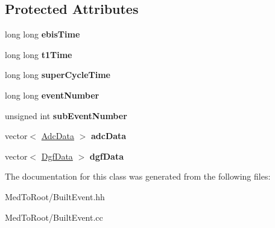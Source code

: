 \subsection*{Protected Attributes}
\begin{DoxyCompactItemize}
\item 
\mbox{\label{class_built_event_a03d3a46cd8ffa584750f814895a36719}} 
long long {\bfseries ebis\+Time}
\item 
\mbox{\label{class_built_event_a7a57667e365324e20b3cd27411bf27a4}} 
long long {\bfseries t1\+Time}
\item 
\mbox{\label{class_built_event_af4382a0a57b77db32d3934fa2764109f}} 
long long {\bfseries super\+Cycle\+Time}
\item 
\mbox{\label{class_built_event_a2492458c6571f5bbbb4d4083b380bf33}} 
long long {\bfseries event\+Number}
\item 
\mbox{\label{class_built_event_ab0b418e8733a07abbe5008d0b0dd4263}} 
unsigned int {\bfseries sub\+Event\+Number}
\item 
\mbox{\label{class_built_event_adeb272a29e4b64150197eb14d8f99d9c}} 
vector$<$ \hyperlink{class_adc_data}{Adc\+Data} $>$ {\bfseries adc\+Data}
\item 
\mbox{\label{class_built_event_acec847a035bef94b9820e31d1d1468ee}} 
vector$<$ \hyperlink{class_dgf_data}{Dgf\+Data} $>$ {\bfseries dgf\+Data}
\end{DoxyCompactItemize}


The documentation for this class was generated from the following files\+:\begin{DoxyCompactItemize}
\item 
Med\+To\+Root/Built\+Event.\+hh\item 
Med\+To\+Root/Built\+Event.\+cc\end{DoxyCompactItemize}
